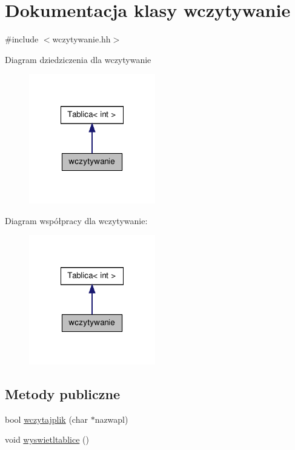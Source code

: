 \hypertarget{classwczytywanie}{\section{Dokumentacja klasy wczytywanie}
\label{classwczytywanie}
}


{\ttfamily \#include $<$wczytywanie.\-hh$>$}



Diagram dziedziczenia dla wczytywanie
\nopagebreak
\begin{figure}[H]
\begin{center}
\leavevmode
\includegraphics[width=156pt]{classwczytywanie__inherit__graph}
\end{center}
\end{figure}


Diagram współpracy dla wczytywanie\-:
\nopagebreak
\begin{figure}[H]
\begin{center}
\leavevmode
\includegraphics[width=156pt]{classwczytywanie__coll__graph}
\end{center}
\end{figure}
\subsection*{Metody publiczne}
\begin{DoxyCompactItemize}
\item 
bool \hyperlink{classwczytywanie_a4cf227bcd7c219b65391b2e91263b76f}{wczytajplik} (char $\ast$nazwapl)
\item 
void \hyperlink{classwczytywanie_ae6152d8f524229500162611b3ef321f9}{wyswietltablice} ()
\end{DoxyCompactItemize}
